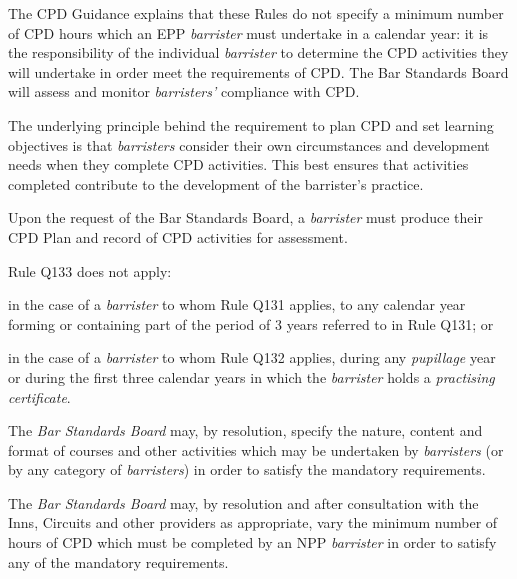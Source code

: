 The CPD Guidance explains that these Rules do not specify a minimum
number of CPD hours which an EPP \emph{barrister} must undertake in a
calendar year: it is the responsibility of the individual
\emph{barrister} to determine the CPD activities they will undertake in
order meet the requirements of CPD. The Bar Standards Board will assess
and monitor \emph{barristers'} compliance with CPD.


The underlying principle behind the requirement to plan CPD and set
learning objectives is that \emph{barristers} consider their own
circumstances and development needs when they complete CPD activities.
This best ensures that activities completed contribute to the
development of the barrister's practice.




Upon the request of the Bar Standards Board, a \emph{barrister} must
produce their CPD Plan and record of CPD activities for assessment.


Rule Q133 does not apply:
\nl
 \item in the case of a \emph{barrister} to whom Rule Q131 applies, to any
calendar year forming or containing part of the period of 3 years
referred to in Rule Q131; or

 \item in the case of a \emph{barrister} to whom Rule Q132 applies, during
any \emph{pupillage} year or during the first three calendar years in
which the \emph{barrister} holds a \emph{practising certificate}.\ln


The \emph{Bar Standards Board} may, by resolution, specify the nature,
content and format of courses and other activities which may be
undertaken by \emph{barristers} (or by any category of
\emph{barristers}) in order to satisfy the mandatory requirements.


The \emph{Bar Standards Board} may, by resolution and after consultation
with the Inns, Circuits and other providers as appropriate, vary the
minimum number of hours of CPD which must be completed by an NPP
\emph{barrister} in order to satisfy any of the mandatory requirements.


